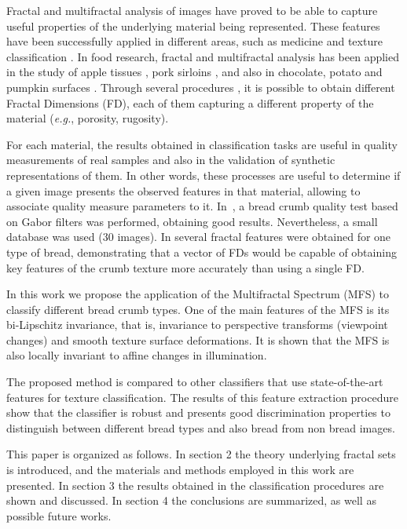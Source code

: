 \documentclass[a4paper,10pt]{article}
\begin{document}
Fractal and multifractal analysis of images have proved to be able to capture useful properties of the underlying material being represented. These features have been successfully applied in different areas, such as medicine \cite{Andjelkovic2008,Yu2011} and texture classification \cite{Wendt2009}. In food research, fractal and multifractal analysis has been applied in the study of apple tissues \cite{Mendoza2010}, pork sirloins \cite{Serrano2012}, and also in chocolate, potato and pumpkin surfaces \cite{Quevedo2002}. Through several procedures \cite{Peitgen2004, Gonzales2008}, it is possible to obtain different Fractal Dimensions (FD), each of them capturing a different property of the material ({\em e.g.}, porosity, rugosity).

For each material, the results obtained in classification tasks are useful in quality measurements of real samples and also in the validation of synthetic representations of them. In other words, these processes are useful to determine if a given image presents the observed features in that material, allowing to associate quality measure parameters to it. In~\cite{Fan2006}, a bread crumb quality test based on Gabor filters was performed, obtaining good results. Nevertheless, a small database was used ($30$ images). In \cite{Gonzales2008} several fractal features were obtained for one type of bread, demonstrating that a vector of FDs would be capable of obtaining key features of the crumb texture more accurately than using a single FD.

In this work we propose the application of the Multifractal Spectrum (MFS) \cite{Xu2006} to classify different bread crumb types. One of the main features of the MFS is its bi-Lipschitz invariance, that is, invariance to perspective transforms (viewpoint changes) and smooth texture surface deformations. It is shown that the MFS is also locally invariant to affine changes in illumination.

The proposed method is compared to other classifiers that use state-of-the-art features for texture classification. The results of this feature extraction procedure show that the classifier is robust and presents good discrimination properties to distinguish between different bread types and also bread from non bread images. 

This paper is organized as follows. In section 2 the theory underlying fractal sets is introduced, and the materials and methods employed in this work are presented. In section 3 the results obtained in the classification procedures are shown and discussed. In section 4 the conclusions are summarized, as well as possible future works.
\end{document}
